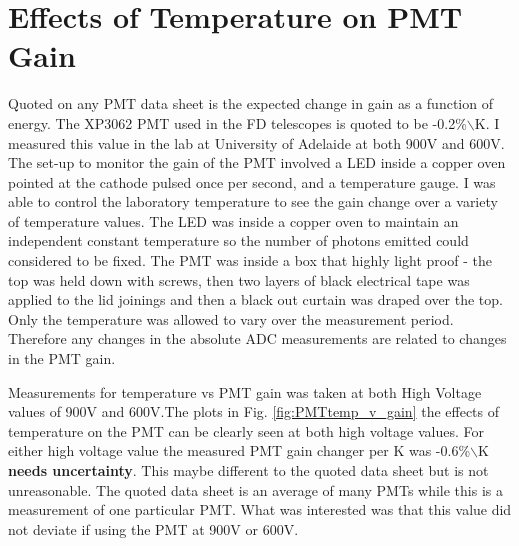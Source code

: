 \section{Effects of Temperature on PMT Gain}

Quoted on any PMT data sheet is the expected change in gain as a function of energy. The XP3062 PMT used in the FD telescopes is quoted to be -0.2\%$\backslash$K. I measured this value in the lab at University of Adelaide at both 900V and 600V. The set-up to monitor the gain of the PMT involved a LED inside a copper oven pointed at the cathode pulsed once per second, and a temperature gauge. I was able to control the laboratory temperature to see the gain change over a variety of temperature values. The LED was inside a copper oven to maintain an independent constant temperature so the number of photons emitted could considered to be fixed. The PMT was inside a box that highly light proof - the top was held down with screws, then two layers of black electrical tape was applied to the lid joinings and then a black out curtain was draped over the top. Only the temperature was allowed to vary over the measurement period. Therefore any changes in the absolute ADC measurements are related to changes in the PMT gain.

Measurements for temperature vs PMT gain was taken at both High Voltage values of 900V and 600V.The plots in Fig. \ref{fig:PMTtemp_v_gain} the effects of temperature on the PMT can be clearly seen at both high voltage values. For either high voltage value the measured PMT gain changer per K was -0.6\%$\backslash$K \textbf{needs uncertainty}. This maybe different to the quoted data sheet but is not unreasonable. The quoted data sheet is an average of many PMTs while this is a measurement of one particular PMT. What was interested was that this value did not deviate if using the PMT at 900V or 600V.


